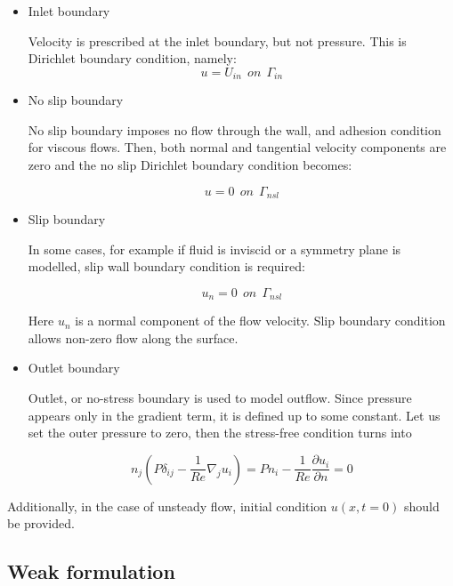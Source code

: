 \begin{itemize}
    \item Inlet boundary
    
    Velocity is prescribed at the inlet boundary, but not pressure. This is Dirichlet boundary condition, namely:
    \begin{equation}
    u = U_{in} \ \ on \ \ \Gamma_{in}
    \end{equation}
    
    \item No slip boundary
    
    No slip boundary imposes no flow through the wall, and adhesion condition for viscous flows. Then, both normal and tangential velocity components are zero and the no slip Dirichlet boundary condition becomes:
   
    \begin{equation}
    u = 0 \ \ on \ \ \Gamma_{nsl}
    \end{equation} 
    
    \item Slip boundary
    
    In some cases, for example if fluid is inviscid or a symmetry plane is modelled, slip wall boundary condition is required:
    
    \begin{equation}
    u_n = 0 \ \ on \ \ \Gamma_{nsl}
    \end{equation} 
    
    Here $u_n$ is a normal component of the flow velocity. Slip boundary condition allows non-zero flow along the surface.
    
    \item Outlet boundary
    
    Outlet, or no-stress boundary is used to model outflow. Since pressure appears only in the gradient term, it is defined up to some constant. Let us set the outer pressure to zero, then the stress-free condition turns into
    
    \begin{equation}
    n_j (P\delta_{ij} - \frac{1}{Re} \nabla_j u_i) = P n_i - \frac{1}{Re} \frac{\partial u_i}{\partial n} = 0
    \end{equation}
    
\end{itemize}

Additionally, in the case of unsteady flow, initial condition $u(x,t=0)$ should be provided.

\subsection{Weak formulation}


